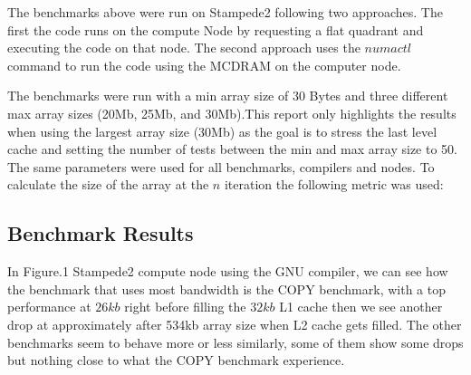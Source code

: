 \documentclass[12pt]{article} %
\begin{document}
The benchmarks above were run on Stampede2 following two approaches. The first the code runs on the compute Node by requesting a flat quadrant and executing the code on that node. The second approach uses the $numactl$ command to run the code using the MCDRAM on the computer node. 

The benchmarks were run with a min array size of 30 Bytes and three different max array sizes (20Mb, 25Mb, and 30Mb).This report only highlights the results when using the largest array size (30Mb) as the goal is to stress the last level cache and setting the number of tests between the min and max array size to 50. The same parameters were used for all benchmarks, compilers and nodes. To calculate the size of the array at the $n$ iteration the following metric was used:

\begin{table}[ht]
\end{table}

\newpage

\subsection{Benchmark Results}

In Figure.1 Stampede2 compute node using the GNU compiler, we can see how the benchmark that uses most bandwidth is the \textsc{COPY} benchmark, with a top performance at $26kb$ right before filling the $32kb$ L1 cache then we see another drop at approximately after 534kb array size when L2 cache gets  filled. The other benchmarks seem to behave more or less similarly, some of them show some drops but nothing close to what the \textsc{COPY} benchmark experience.
\end{document}

